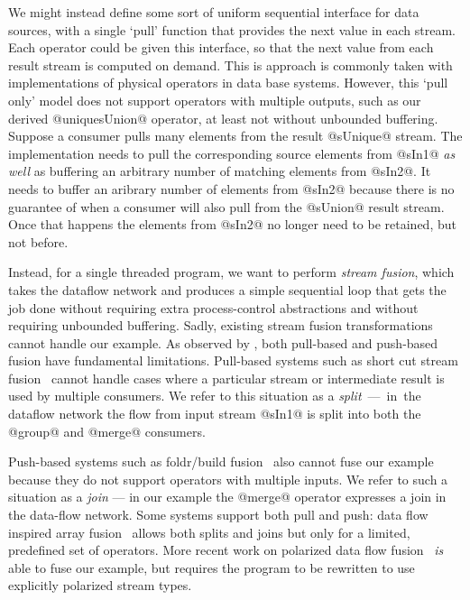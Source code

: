 We might instead define some sort of uniform sequential interface for data sources, with a single `pull' function that provides the next value in each stream. Each operator could be given this interface, so that the next value from each result stream is computed on demand. This is approach is commonly taken with implementations of physical operators in data base systems. However, this `pull only' model does not support operators with multiple outputs, such as our derived @uniquesUnion@ operator, at least not without unbounded buffering. Suppose a consumer pulls many elements from the result @sUnique@ stream. The implementation needs to pull the corresponding source elements from @sIn1@ \emph{as well} as buffering an arbitrary number of matching elements from @sIn2@. It needs to buffer an aribrary number of elements from @sIn2@ because there is no guarantee of when a consumer will also pull from the @sUnion@ result stream. Once that happens the elements from @sIn2@ no longer need to be retained, but not before.

Instead, for a single threaded program, we want to perform \emph{stream fusion}, which takes the dataflow network and produces a simple sequential loop that gets the job done without requiring extra process-control abstractions and without requiring unbounded buffering. Sadly, existing stream fusion transformations cannot handle our example. As observed by \citet{kay2009you}, both pull-based and push-based fusion have fundamental limitations. Pull-based systems such as short cut stream fusion~\cite{coutts2007stream} cannot handle cases where a particular stream or intermediate result is used by multiple consumers. We refer to this situation as a \mbox{\emph{split} --- in the} dataflow network the flow from input stream @sIn1@ is split into both the @group@ and @merge@ consumers. 


Push-based systems such as foldr/build fusion~\cite{gill1993short} also cannot fuse our example because they do not support operators with multiple inputs. We refer to such a situation as a \emph{join} --- in our example the @merge@ operator expresses a join in the data-flow network. Some systems support both pull and push: data flow inspired array fusion~\cite{lippmeier2013data} allows both splits and joins but only for a limited, predefined set of operators. More recent work on polarized data flow fusion~\cite{lippmeier2016polarized} \emph{is} able to fuse our example, but requires the program to be rewritten to use explicitly polarized stream types. 

